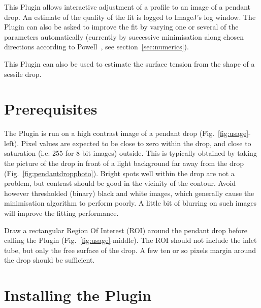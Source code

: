\documentclass[fleqn]{scrartcl}
\begin{document}
This Plugin allows interactive adjustment of a profile to an image of
a pendant drop. An estimate of the quality of the fit is logged to
ImageJ's log window. The Plugin can also be asked to improve the fit
by varying one or several of the parameters automatically (currently
by successive minimisation along chosen directions according to
Powell~\cite{Powell1965,Brandt1992}, see section~\ref{sec:numerics}).

This Plugin can also be used to estimate the surface tension from the
shape of a sessile drop.


\section{Prerequisites}
\label{sec:prerequisites}

The Plugin is run on a high contrast image of a pendant drop
(Fig.~\ref{fig:usage}-left). Pixel values are expected to be close to
zero within the drop, and close to saturation (i.e. 255 for 8-bit
images) outside. This is typically obtained by taking the picture of
the drop in front of a light background far away from the drop
(Fig.~\ref{fig:pendantdropphoto}). Bright spots well within the drop
are not a problem, but contrast should be good in the vicinity of the
contour. Avoid however thresholded (binary) black and white images,
which generally cause the minimisation algorithm to perform poorly. A
little bit of blurring on such images will improve the fitting
performance.

Draw a rectangular Region Of Interest (ROI) around the pendant drop
before calling the Plugin (Fig.~\ref{fig:usage}-middle). The ROI
should not include the inlet tube, but only the free surface of the
drop. A few ten or so pixels margin around the drop should be
sufficient. 

\section{Installing the Plugin}
\label{sec:installation}
\end{document}
